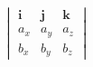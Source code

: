 \documentclass[preview]{standalone}
\begin{document}
\begin{align*}
\begin{vmatrix} \mathbf{i} & \mathbf{j} & \mathbf{k} \\ a_x & a_y & a_z \\ b_x & b_y & b_z \end{vmatrix}
\end{align*}
\end{document}
